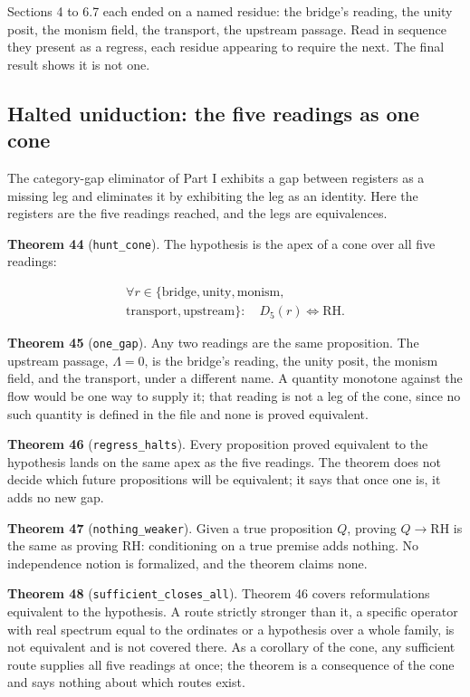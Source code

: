 \documentclass[10pt]{article}
\begin{document}
Sections 4 to 6.7 each ended on a named residue: the bridge's reading,
the unity posit, the monism field, the transport, the upstream passage.
Read in sequence they present as a regress, each residue appearing to
require the next. The final result shows it is not one.

\hypertarget{halted-uniduction-the-five-readings-as-one-cone}{%
\subsection{Halted uniduction: the five readings as one
cone}\label{halted-uniduction-the-five-readings-as-one-cone}}

The category-gap eliminator of Part I exhibits a gap between registers
as a missing leg and eliminates it by exhibiting the leg as an identity.
Here the registers are the five readings reached, and the legs are
equivalences.

\textbf{Theorem 44} (\texttt{hunt\_cone}). The hypothesis is the apex of
a cone over all five readings:

\[\begin{gathered}\forall r \in \{\text{bridge}, \text{unity}, \text{monism},\\ \text{transport}, \text{upstream}\}:\quad D_5(r) \iff \mathrm{RH}.\end{gathered}\]

\textbf{Theorem 45} (\texttt{one\_gap}). Any two readings are the same
proposition. The upstream passage, \(\Lambda = 0\), is the bridge's
reading, the unity posit, the monism field, and the transport, under a
different name. A quantity monotone against the flow would be one way to
supply it; that reading is not a leg of the cone, since no such quantity
is defined in the file and none is proved equivalent.

\textbf{Theorem 46} (\texttt{regress\_halts}). Every proposition proved
equivalent to the hypothesis lands on the same apex as the five
readings. The theorem does not decide which future propositions will be
equivalent; it says that once one is, it adds no new gap.

\textbf{Theorem 47} (\texttt{nothing\_weaker}). Given a true proposition
\(Q\), proving \(Q \to \mathrm{RH}\) is the same as proving RH:
conditioning on a true premise adds nothing. No independence notion is
formalized, and the theorem claims none.

\textbf{Theorem 48} (\texttt{sufficient\_closes\_all}). Theorem 46
covers reformulations equivalent to the hypothesis. A route strictly
stronger than it, a specific operator with real spectrum equal to the
ordinates or a hypothesis over a whole family, is not equivalent and is
not covered there. As a corollary of the cone, any sufficient route
supplies all five readings at once; the theorem is a consequence of the
cone and says nothing about which routes exist.
\end{document}
